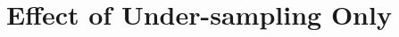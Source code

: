\documentclass[11pt]{article}
\begin{document}
%
%
%
%


%
%
%



\clearpage
\section{Effect of Under-sampling Only}
\end{document}

